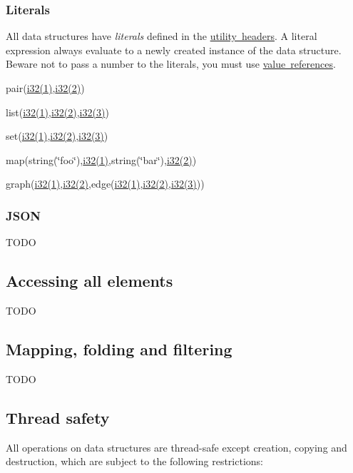\subsubsection*{Literals}

All data structures have {\itshape literals} defined in the \hyperlink{literals_8h}{utility~headers}. A literal expression always evaluate to a newly created instance of the data structure. Beware not to pass a number to the literals, you must use \hyperlink{md__data_structures_ValueReferences}{value~references}.


\begin{DoxyItemize}
\item {\ttfamily pair(\hyperlink{util_8h_a832509ea197065489f1d60b6d7958cbf}{i32(1)},\hyperlink{util_8h_a832509ea197065489f1d60b6d7958cbf}{i32(2)})}
\item {\ttfamily list(\hyperlink{util_8h_a832509ea197065489f1d60b6d7958cbf}{i32(1)},\hyperlink{util_8h_a832509ea197065489f1d60b6d7958cbf}{i32(2)},\hyperlink{util_8h_a832509ea197065489f1d60b6d7958cbf}{i32(3)})}
\item {\ttfamily set(\hyperlink{util_8h_a832509ea197065489f1d60b6d7958cbf}{i32(1)},\hyperlink{util_8h_a832509ea197065489f1d60b6d7958cbf}{i32(2)},\hyperlink{util_8h_a832509ea197065489f1d60b6d7958cbf}{i32(3)})}
\item {\ttfamily map(string(\char`\"{}foo\char`\"{}),\hyperlink{util_8h_a832509ea197065489f1d60b6d7958cbf}{i32(1)},string(\char`\"{}bar\char`\"{}),\hyperlink{util_8h_a832509ea197065489f1d60b6d7958cbf}{i32(2)})}
\item {\ttfamily graph(\hyperlink{util_8h_a832509ea197065489f1d60b6d7958cbf}{i32(1)},\hyperlink{util_8h_a832509ea197065489f1d60b6d7958cbf}{i32(2)},edge(\hyperlink{util_8h_a832509ea197065489f1d60b6d7958cbf}{i32(1)},\hyperlink{util_8h_a832509ea197065489f1d60b6d7958cbf}{i32(2)},\hyperlink{util_8h_a832509ea197065489f1d60b6d7958cbf}{i32(3)}))}
\end{DoxyItemize}

\subsubsection*{J\-S\-O\-N}

T\-O\-D\-O\hypertarget{md__data_structures_ForEach}{}\subsection{Accessing all elements}\label{md__data_structures_ForEach}
T\-O\-D\-O\hypertarget{md__data_structures_MapFoldFilter}{}\subsection{Mapping, folding and filtering}\label{md__data_structures_MapFoldFilter}
T\-O\-D\-O\hypertarget{md__data_structures_ThreadSafety}{}\subsection{Thread safety}\label{md__data_structures_ThreadSafety}
All operations on data structures are thread-\/safe except creation, copying and destruction, which are subject to the following restrictions\-:


